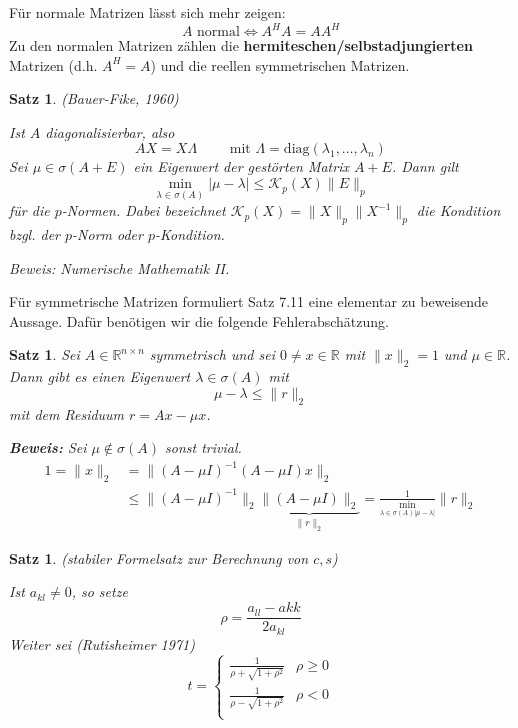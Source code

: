 \documentclass[%
a4paper,
11pt,		%
leqno,		%
]
{scrartcl}
\theoremstyle{plain}
\theoremstyle{plain}
\newtheorem{mysatz}[mydef]{Satz}
\theoremstyle{plain}
\begin{document}
Für normale Matrizen lässt sich mehr zeigen:
\[
A \text{ normal} \Leftrightarrow A^HA = AA^H
\]
Zu den normalen Matrizen zählen die \textbf{hermiteschen/selbstadjungierten} Matrizen (d.h. $A^H = A$) und die reellen symmetrischen Matrizen.


\begin{mysatz} (Bauer-Fike, 1960)

Ist $A$ diagonalisierbar, also
\[
AX = X\Lambda \qquad \text{ mit } \Lambda = \text{diag}(\lambda_1,\dots,\lambda_n)
\]
Sei $\mu \in \sigma(A+E)$ ein Eigenwert der gestörten Matrix $A+E$. Dann gilt
\[
\min\limits_{\lambda \in \sigma(A)} |\mu - \lambda| \leq \mathcal{K}_p(X) \|E\|_p
\]
für die $p$-Normen. Dabei bezeichnet $\mathcal{K}_p(X) = \|X\|_p \|X^{-1}\|_p$ die Kondition bzgl. der $p$-Norm oder $p$-Kondition.

Beweis: Numerische Mathematik II.
\end{mysatz}

Für symmetrische Matrizen formuliert Satz 7.11 %
eine elementar zu beweisende Aussage. Dafür benötigen wir die folgende Fehlerabschätzung.

\begin{mysatz}
Sei $A \in \mathbb{R}^{n \times n}$ symmetrisch und sei $0 \neq x \in \mathbb{R}$ mit $\|x\|_2 = 1$ und $\mu \in \mathbb{R}$. Dann gibt es einen Eigenwert 
$\lambda \in \sigma(A)$ mit
\[
\mu - \lambda \leq \|r\|_2
\]
mit dem Residuum $r = Ax - \mu x$.

\textbf{Beweis:} Sei $\mu \notin \sigma(A)$ sonst trivial.
\begin{align*}
1 = \|x\|_2 & = \|(A -\mu I)^{-1} (A - \mu I)x \|_2 \\
 & \leq \|(A - \mu I)^{-1}\|_2 \underbrace{\|(A - \mu I)\|_2}_{\|r\|_2} = \frac{1}{\min\limits_{\lambda \in \sigma(A) |\mu - \lambda|}} \|r\|_2
\end{align*}
\end{mysatz}


\begin{mysatz}
(stabiler Formelsatz zur Berechnung von $c,s$)

Ist $a_{kl} \neq 0$, so setze
\[
\rho = \frac{a_{ll}-a{kk}}{2a_{kl}}
\]
Weiter sei (Rutisheimer 1971)
\[
t = 
\begin{cases}
\frac{1}{\rho + \sqrt{1+\rho^2}} & \rho \geq 0\\
\frac{1}{\rho - \sqrt{1+\rho^2}} & \rho < 0\\
\end{cases}
\]
\end{mysatz}


\end{document}
